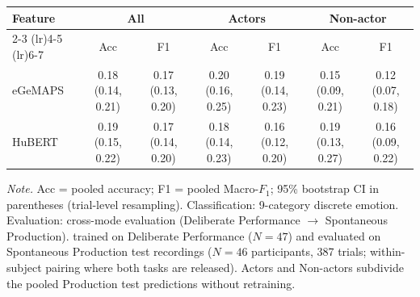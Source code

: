\begin{tabular}{lcccccc}
\toprule
Feature & \multicolumn{2}{c}{All} & \multicolumn{2}{c}{Actors} & \multicolumn{2}{c}{Non-actor} \\
\cmidrule(lr){2-3} \cmidrule(lr){4-5} \cmidrule(lr){6-7}
 & Acc & F1 & Acc & F1 & Acc & F1 \\
\midrule
eGeMAPS & 0.18 (0.14, 0.21) & 0.17 (0.13, 0.20) & 0.20 (0.16, 0.25) & 0.19 (0.14, 0.23) & 0.15 (0.09, 0.21) & 0.12 (0.07, 0.18) \\
HuBERT & 0.19 (0.15, 0.22) & 0.17 (0.14, 0.20) & 0.18 (0.14, 0.23) & 0.16 (0.12, 0.20) & 0.19 (0.13, 0.27) & 0.16 (0.09, 0.22) \\
\bottomrule
\end{tabular}
\par\smallskip\noindent\scriptsize\textit{Note.} Acc = pooled accuracy; F1 = pooled Macro-$F_1$; 95\% bootstrap CI in parentheses (trial-level resampling). Classification: 9-category discrete emotion. Evaluation: cross-mode evaluation (Deliberate Performance $\rightarrow$ Spontaneous Production). trained on Deliberate Performance ($N=47$) and evaluated on Spontaneous Production test recordings ($N=46$ participants, 387 trials; within-subject pairing where both tasks are released). Actors and Non-actors subdivide the pooled Production test predictions without retraining.